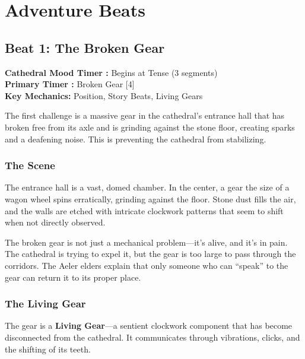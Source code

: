 \documentclass{article}
\begin{document}
\section{Adventure Beats}

\subsection{Beat 1: The Broken Gear}

\begin{mechanicbox}
\textbf{Cathedral Mood Timer :} Begins at Tense (3 segments) \\
\textbf{Primary Timer :} Broken Gear [4] \\
\textbf{Key Mechanics:} Position, Story Beats, Living Gears
\end{mechanicbox}

The first challenge is a massive gear in the cathedral's entrance hall that has broken free from its axle and is grinding against the stone floor, creating sparks and a deafening noise. This is preventing the cathedral from stabilizing.

\subsubsection{The Scene}

The entrance hall is a vast, domed chamber. In the center, a gear the size of a wagon wheel spins erratically, grinding against the floor. Stone dust fills the air, and the walls are etched with intricate clockwork patterns that seem to shift when not directly observed.

The broken gear is not just a mechanical problem---it's alive, and it's in pain. The cathedral is trying to expel it, but the gear is too large to pass through the corridors. The Aeler elders explain that only someone who can ``speak'' to the gear can return it to its proper place.

\subsubsection{The Living Gear}

The gear is a \textbf{Living Gear}---a sentient clockwork component that has become disconnected from the cathedral. It communicates through vibrations, clicks, and the shifting of its teeth.
\end{document}
